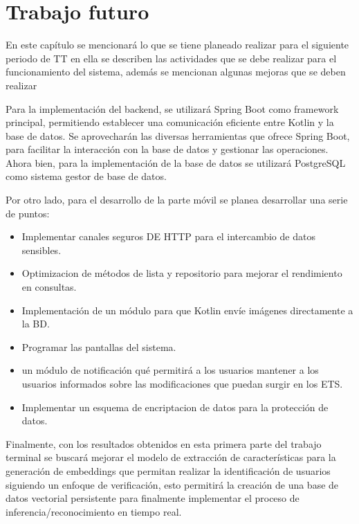 
\chapter{Trabajo futuro}

En este capítulo se mencionará lo que se tiene planeado realizar para el siguiente periodo de TT en ella se describen las actividades que se debe realizar para el funcionamiento del sistema, además se mencionan algunas mejoras que se deben realizar

Para la implementación del backend, se utilizará Spring Boot como framework principal, permitiendo establecer una comunicación eficiente entre Kotlin y la base de datos. Se aprovecharán las diversas herramientas que ofrece Spring Boot, para facilitar la interacción con la base de datos y gestionar las operaciones. 
Ahora bien, para la implementación de la base de datos se utilizará PostgreSQL como sistema gestor de base de datos.

Por otro lado, para el desarrollo de la parte móvil se planea desarrollar una serie de puntos:
\begin{itemize}
    
    \item Implementar canales seguros DE HTTP para el intercambio de datos sensibles. 
    \item Optimizacion de métodos de lista y repositorio para mejorar el rendimiento en consultas. 
    \item Implementación de un módulo para que Kotlin envíe imágenes directamente a la BD. 
    \item Programar las pantallas del sistema. 
    \item un módulo de notificación qué permitirá a los usuarios mantener a los usuarios informados sobre las modificaciones que puedan surgir en los ETS. 
    \item Implementar un esquema de encriptacion de datos para la protección de datos.
\end{itemize}

Finalmente, con los resultados obtenidos en esta primera parte del trabajo terminal se buscará mejorar el modelo de extracción de características para la generación de embeddings que permitan realizar la identificación de usuarios siguiendo un enfoque de verificación, esto permitirá la creación de una base de datos vectorial persistente para finalmente implementar el proceso de inferencia/reconocimiento en tiempo real.